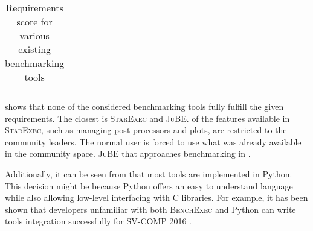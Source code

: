 \begin{table}
\begin{threeparttable}
\begin{adjustbox}{max width=\textwidth}
\begin{tabular}{l | cccccccccc | ccccccccc | cccccc | ccccc}
                \bottomrule
            \end{tabular}
        \end{adjustbox}
        \caption{Requirements score for various existing benchmarking tools}
        \label{tab:reqscoresummary}
    \end{threeparttable}
\end{table}


 shows that none of the considered benchmarking tools fully fulfill the given requirements.
The closest is \textsc{StarExec} and \textsc{JuBE}.
 of the features available in \textsc{StarExec}, such as managing post-processors and plots, are restricted to the community leaders.
The normal user is forced to use what was already available in the community space.
 \textsc{JuBE} that approaches benchmarking in .

Additionally, it can be seen from  that most tools are implemented in Python.
This decision might be because Python offers an easy to understand language while also allowing low-level interfacing with C libraries.
For example, it has been shown that developers unfamiliar with both \textsc{BenchExec} and Python can write tools integration successfully for SV-COMP 2016 \citep{beyerReliableBenchmarkingRequirements2019}.

